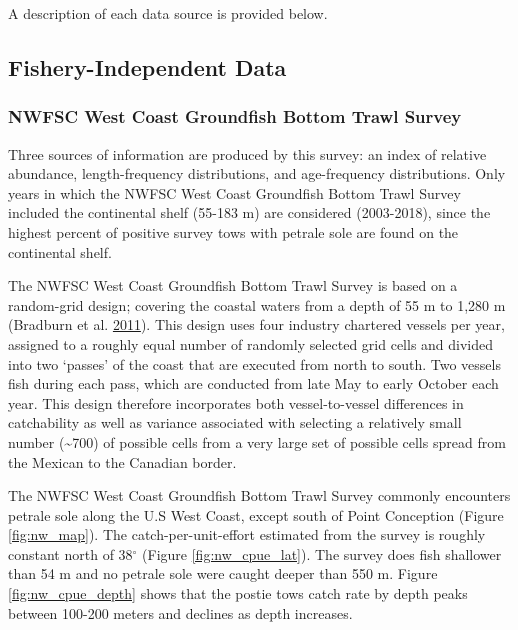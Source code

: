 \documentclass[12pt,]{article}
\begin{document}
A description of each data source is provided below.

\subsection{Fishery-Independent Data}\label{fishery-independent-data}

\subsubsection{NWFSC West Coast Groundfish Bottom Trawl
Survey}\label{nwfsc-west-coast-groundfish-bottom-trawl-survey}

Three sources of information are produced by this survey: an index of
relative abundance, length-frequency distributions, and age-frequency
distributions. Only years in which the NWFSC West Coast Groundfish
Bottom Trawl Survey included the continental shelf (55-183 m) are
considered (2003-2018), since the highest percent of positive survey
tows with petrale sole are found on the continental shelf.

The NWFSC West Coast Groundfish Bottom Trawl Survey is based on a
random-grid design; covering the coastal waters from a depth of 55 m to
1,280 m (Bradburn et al.
\protect\hyperlink{ref-bradburn_2003_2011}{2011}). This design uses four
industry chartered vessels per year, assigned to a roughly equal number
of randomly selected grid cells and divided into two `passes' of the
coast that are executed from north to south. Two vessels fish during
each pass, which are conducted from late May to early October each year.
This design therefore incorporates both vessel-to-vessel differences in
catchability as well as variance associated with selecting a relatively
small number (\textasciitilde{}700) of possible cells from a very large
set of possible cells spread from the Mexican to the Canadian border.

The NWFSC West Coast Groundfish Bottom Trawl Survey commonly encounters
petrale sole along the U.S West Coast, except south of Point Conception
(Figure \ref{fig:nw_map}). The catch-per-unit-effort estimated from the
survey is roughly constant north of 38\(^\circ\) (Figure
\ref{fig:nw_cpue_lat}). The survey does fish shallower than 54 m and no
petrale sole were caught deeper than 550 m. Figure
\ref{fig:nw_cpue_depth} shows that the postie tows catch rate by depth
peaks between 100-200 meters and declines as depth increases.
\end{document}
